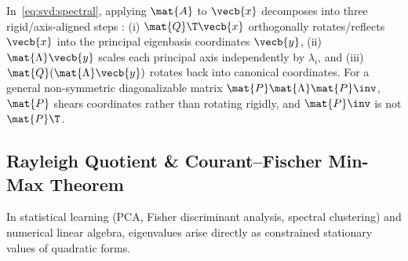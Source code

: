 \documentclass[../../../../master.tex]{subfiles}
\begin{document}
\begin{intuition}
In~\eqref{eq:svd:spectral}, applying $\mat{A}$ to $\vecb{x}$ decomposes into three rigid/axis-aligned steps  : (i) $\mat{Q}\T \vecb{x}$ orthogonally rotates/reflects $\vecb{x}$ into the principal eigenbasis coordinates $\vecb{y}$, (ii) $\mat{\Lambda}\vecb{y}$ scales each principal axis independently by $\lambda_i$, and (iii) $\mat{Q}(\mat{\Lambda}\vecb{y})$ rotates back into canonical coordinates. For a general non-symmetric diagonalizable matrix $\mat{P}\mat{\Lambda}\mat{P}\inv$, $\mat{P}$ shears coordinates rather than rotating rigidly, and $\mat{P}\inv$ is not $\mat{P}\T$.
\end{intuition}

\subsection{Rayleigh Quotient \& Courant--Fischer Min-Max Theorem}
\label{subsec:svd:rayleigh}

In statistical learning (PCA, Fisher discriminant analysis, spectral clustering) and numerical linear algebra, eigenvalues arise directly as constrained stationary values of quadratic forms.
\end{document}
